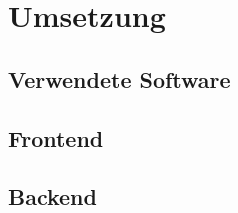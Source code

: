 \chapter{Umsetzung}
    \section{Verwendete Software}
    
    \section{Frontend}
    
    \section{Backend}